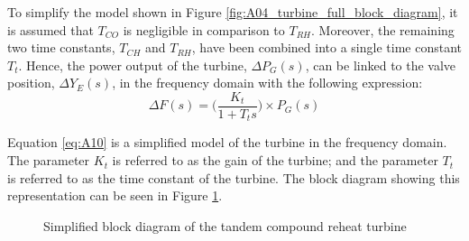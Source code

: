 To simplify the model shown in Figure \ref{fig:A04_turbine_full_block_diagram}, it is assumed that $T_{CO}$ is negligible in comparison to $T_{RH}$. Moreover, the remaining two time constants, $T_{CH}$ and $T_{RH}$, have been combined into a single time constant $T_t$. Hence, the power output of the turbine, $\Delta P_G(s)$, can be linked to the valve position, $\Delta Y_E(s)$, in the frequency domain with the following expression:
\begin{equation}
	\Delta F(s) = \bigg( \frac{K_t}{1 + T_t s} \bigg) \times P_G(s) \label{eq:A10}
\end{equation}

Equation \ref{eq:A10} is a simplified model of the turbine in the frequency domain. The parameter $K_t$ is referred to as the gain of the turbine; and the parameter $T_t$ is referred to as the time constant of the turbine. The block diagram showing this representation can be seen in Figure \ref{fig:A05_turbine_model}. 

\begin{figure}[h]
	\centering
	
	\caption[Simplified turbine model]{Simplified block diagram of the tandem compound reheat turbine}
	\label{fig:A05_turbine_model}
\end{figure}